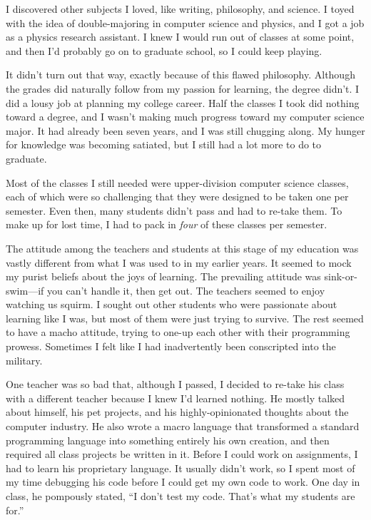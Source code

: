 I discovered other subjects I loved, like writing, philosophy, and science. I toyed with the idea of double-majoring in computer science and physics, and I got a job as a physics research assistant. I knew I would run out of classes at some point, and then I'd probably go on to graduate school, so I could keep playing.

It didn't turn out that way, exactly because of this flawed philosophy. Although the grades did naturally follow from my passion for learning, the degree didn't. I did a lousy job at planning my college career. Half the classes I took did nothing toward a degree, and I wasn't making much progress toward my computer science major. It had already been seven years, and I was still chugging along. My hunger for knowledge was becoming satiated, but I still had a lot more to do to graduate.

Most of the classes I still needed were upper-division computer science classes, each of which were so challenging that they were designed to be taken one per semester. Even then, many students didn't pass and had to re-take them. To make up for lost time, I had to pack in \emph{four} of these classes per semester. 

The attitude among the teachers and students at this stage of my education was vastly different from what I was used to in my earlier years. It seemed to mock my purist beliefs about the joys of learning. The prevailing attitude was sink-or-swim---if you can't handle it, then get out. The teachers seemed to enjoy watching us squirm. I sought out other students who were passionate about learning like I was, but most of them were just trying to survive. The rest seemed to have a macho attitude, trying to one-up each other with their programming prowess. Sometimes I felt like I had inadvertently been conscripted into the military.

One teacher was so bad that, although I passed, I decided to re-take his class with a different teacher because I knew I'd learned nothing. He mostly talked about himself, his pet projects, and his highly-opinionated thoughts about the computer industry. He also wrote a macro language that transformed a standard programming language into something entirely his own creation, and then required all class projects be written in it. Before I could work on assignments, I had to learn his proprietary language. It usually didn't work, so I spent most of my time debugging his code before I could get my own code to work. One day in class, he pompously stated, ``I don't test my code. That's what my students are for.''

